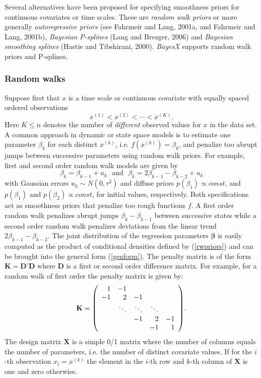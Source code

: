 \documentclass[11pt,a4paper,twoside]{bayesxarticle}
\def \Kvec {\vec{K}}
\def \betavec {\boldsymbol{\beta}}
\def \Dvec {\mathbf{D}}
\def \Kvec {\mathbf{K}}
\def \Xvec {\mathbf{X}}
\begin{document}
Several alternatives have been  proposed for specifying smoothness
priors for continuous covariates or time scales. These are {\em
random walk priors} or more generally {\em autoregressive priors}
(see Fahrmeir and Lang, 2001a, and Fahrmeir and Lang, 2001b), {\em
Bayesian P-splines} (Lang and Brezger, 2006) and {\em Bayesian
smoothing splines} (Hastie and Tibshirani, 2000). {\em BayesX}
supports random walk priors and P-splines.

\subsubsection{Random walks}

Suppose first that $x$ is a time scale or continuous covariate
with equally spaced ordered observations
$$
x^{(1)} < x^{(2)} < \cdots < x^{(K)}.
$$
Here $K \leq n$ denotes the number of {\em different} observed
values for $x$ in the data set. A common approach in dynamic or
state space models is to estimate one parameter $\beta_{k}$ for
each distinct $x^{(k)}$, i.e. $f(x^{(k)}) = \beta_{k}$, and
penalize too abrupt jumps between successive parameters using random
walk priors. For example, first and second order random walk models
are given by
\begin{equation}
\label{rwpriors}
\beta_{k}=\beta_{k-1}+u_{k}\,\,\,\,\mbox{and}\,\,\,\,\beta_{k}=2\beta_{k-1}-\beta_{k-2}+u_{k}
\end{equation}
with Gaussian errors $u_{k}\sim N(0,\tau^{2})$ and diffuse priors
$p(\beta_{1})\propto const$, and $p(\beta_{1})$ and
$p(\beta_{2})\propto const$, for initial values, respectively. Both
specifications act as smoothness priors that penalize too rough
functions $f$. A first order random walk penalizes abrupt jumps
$\beta_{k}-\beta_{k-1}$ between successive states while a second
order random walk penalizes deviations from the linear trend $2
\beta_{k-1}-\beta_{k-2}$. The joint distribution of the
regression parameters $\betavec$ is easily computed as the product of
conditional densities defined by (\ref{rwpriors}) and can be brought
into the general form (\ref{genform}). The penalty matrix is of the
form $\Kvec=\Dvec'\Dvec$ where $\Dvec$ is a first or second order difference
matrix. For example, for a random walk of first order the penalty
matrix is given by:
$$
\Kvec = {\footnotesize \left(
\begin{array}{rrrrr}
 1 & -1 & & &  \\
-1 & 2 & -1 & & \\
 &  \ddots & \ddots & \ddots &  \\
 & & -1 & 2 & -1 \\
  & & & -1 & 1
\end{array}
\right) }.
$$
The design matrix $\Xvec$ is a simple 0/1 matrix where the number of
columns equals the number of parameters, i.e. the number of distinct
covariate values. If for the $i$-th observation $x_{i}=x^{(k)}$
the element in the $i$-th row and $k$-th column of $\Xvec$ is one and
zero otherwise.
\end{document}
